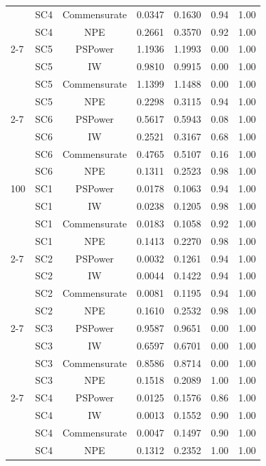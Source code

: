 \begin{longtable}{llccccc}
& SC4 & Commensurate & 0.0347 & 0.1630 & 0.94 & 1.00 \\
& SC4 & NPE          & 0.2661 & 0.3570 & 0.92 & 1.00 \\
\cmidrule(lr){2-7}
& SC5 & PSPower      & 1.1936 & 1.1993 & 0.00 & 1.00 \\
& SC5 & IW           & 0.9810 & 0.9915 & 0.00 & 1.00 \\
& SC5 & Commensurate & 1.1399 & 1.1488 & 0.00 & 1.00 \\
& SC5 & NPE          & 0.2298 & 0.3115 & 0.94 & 1.00 \\
\cmidrule(lr){2-7}
& SC6 & PSPower      & 0.5617 & 0.5943 & 0.08 & 1.00 \\
& SC6 & IW           & 0.2521 & 0.3167 & 0.68 & 1.00 \\
& SC6 & Commensurate & 0.4765 & 0.5107 & 0.16 & 1.00 \\
& SC6 & NPE          & 0.1311 & 0.2523 & 0.98 & 1.00 \\
\midrule
100 & SC1 & PSPower      & 0.0178 & 0.1063 & 0.94 & 1.00 \\
& SC1 & IW           & 0.0238 & 0.1205 & 0.98 & 1.00 \\
& SC1 & Commensurate & 0.0183 & 0.1058 & 0.92 & 1.00 \\
& SC1 & NPE          & 0.1413 & 0.2270 & 0.98 & 1.00 \\
\cmidrule(lr){2-7}
& SC2 & PSPower      & 0.0032 & 0.1261 & 0.94 & 1.00 \\
& SC2 & IW           & 0.0044 & 0.1422 & 0.94 & 1.00 \\
& SC2 & Commensurate & 0.0081 & 0.1195 & 0.94 & 1.00 \\
& SC2 & NPE          & 0.1610 & 0.2532 & 0.98 & 1.00 \\
\cmidrule(lr){2-7}
& SC3 & PSPower      & 0.9587 & 0.9651 & 0.00 & 1.00 \\
& SC3 & IW           & 0.6597 & 0.6701 & 0.00 & 1.00 \\
& SC3 & Commensurate & 0.8586 & 0.8714 & 0.00 & 1.00 \\
& SC3 & NPE          & 0.1518 & 0.2089 & 1.00 & 1.00 \\
\cmidrule(lr){2-7}
& SC4 & PSPower      & 0.0125 & 0.1576 & 0.86 & 1.00 \\
& SC4 & IW           & 0.0013 & 0.1552 & 0.90 & 1.00 \\
& SC4 & Commensurate & 0.0047 & 0.1497 & 0.90 & 1.00 \\
& SC4 & NPE          & 0.1312 & 0.2352 & 1.00 & 1.00 \\

\end{longtable}
